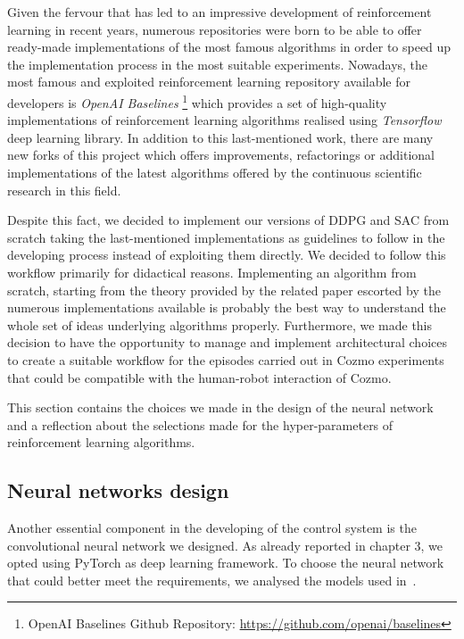 Given the fervour that has led to an impressive development of reinforcement learning in recent years, numerous repositories were born to be able to offer ready-made implementations of the most famous algorithms in order to speed up the implementation process in the most suitable experiments.
Nowadays, the most famous and exploited reinforcement learning repository available for developers is \textit{OpenAI Baselines} \footnote{OpenAI Baselines Github Repository: \href{https://github.com/openai/baselines}{https://github.com/openai/baselines}} which provides a set of high-quality implementations of reinforcement learning algorithms realised using \textit{Tensorflow} deep learning library.
In addition to this last-mentioned work, there are many new forks of this project which offers improvements, refactorings or additional implementations of the latest algorithms offered by the continuous scientific research in this field.

Despite this fact, we decided to implement our versions of DDPG and SAC from scratch taking the last-mentioned implementations as guidelines to follow in the developing process instead of exploiting them directly.
We decided to follow this workflow primarily for didactical reasons.
Implementing an algorithm from scratch, starting from the theory provided by the related paper escorted by the numerous implementations available is probably the best way to understand the whole set of ideas underlying algorithms properly.
Furthermore, we made this decision to have the opportunity to manage and implement architectural choices to create a suitable workflow for the episodes carried out in Cozmo experiments that could be compatible with the human-robot interaction of Cozmo.

This section contains the choices we made in the design of the neural network and a reflection about the selections made for the hyper-parameters of reinforcement learning algorithms.

\subsection{Neural networks design}

Another essential component in the developing of the control system is the convolutional neural network we designed.
As already reported in chapter 3, we opted using PyTorch as deep learning framework.
To choose the neural network that could better meet the requirements, we analysed the models used in~\cite{lillicrap2015continuous,kendall2018learning,haarnoja2018soft, haarnoja2018alg}.

